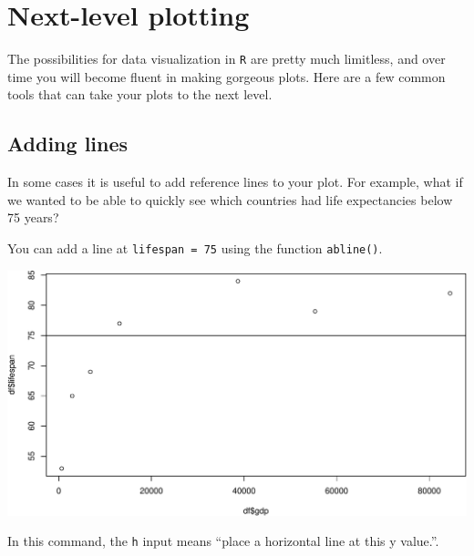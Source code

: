 \documentclass[
]{book}
\newenvironment{Shaded}{\begin{snugshade}}{\end{snugshade}}
\newcommand{\DataTypeTok}[1]{\textcolor[rgb]{0.13,0.29,0.53}{#1}}
\newcommand{\DecValTok}[1]{\textcolor[rgb]{0.00,0.00,0.81}{#1}}
\newcommand{\KeywordTok}[1]{\textcolor[rgb]{0.13,0.29,0.53}{\textbf{#1}}}
\newcommand{\NormalTok}[1]{#1}
\newcommand{\OperatorTok}[1]{\textcolor[rgb]{0.81,0.36,0.00}{\textbf{#1}}}
\newcommand{\StringTok}[1]{\textcolor[rgb]{0.31,0.60,0.02}{#1}}
\begin{document}
\hypertarget{next-level-plotting}{%
\section*{Next-level plotting}\label{next-level-plotting}}

The possibilities for data visualization in \texttt{R} are pretty much limitless, and over time you will become fluent in making gorgeous plots. Here are a few common tools that can take your plots to the next level.

\hypertarget{adding-lines}{%
\subsection*{Adding lines}\label{adding-lines}}

In some cases it is useful to add reference lines to your plot. For example, what if we wanted to be able to quickly see which countries had life expectancies below 75 years?

You can add a line at \texttt{lifespan\ =\ 75} using the function \texttt{abline()}.

\begin{Shaded}
\end{Shaded}

\includegraphics{figures/unnamed-chunk-118-1.pdf}

In this command, the \texttt{h} input means ``place a horizontal line at this y value.''.
\end{document}
